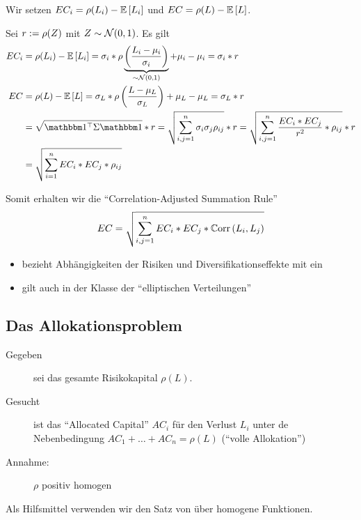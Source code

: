 Wir setzen $EC_i = \rho(L_i) - \mathbb{E} \left[ L_i \right]$ und $EC = \rho(L) - \mathbb{E} \left[ L \right]$.

Sei $r \mathrel{:=} \rho(Z)$ mit $Z \sim \mathcal{N}(0,1)$. Es gilt
\begin{equation*}
	\begin{aligned}
		EC_i &= \rho(L_i) - \EW[L_i] = \sigma_i * \rho\underbrace{\brackets{\frac{L_i - \mu_i}{\sigma_i}}}_{\sim \Normal(0,1)} + \mu_i - \mu_i = \sigma_i * r \\
		EC &= \rho(L) - \EW[L] = \sigma_L * \rho \brackets{\frac{L - \mu_L}{\sigma_L}} + \mu_L - \mu_L = \sigma_L * r \\
		&= \sqrt{\trans{\one} \Sigma \one} * r = \sqrt{\sum_{i,j = 1}^{n} \sigma_i \sigma_j \rho_{ij}} * r = \sqrt{\sum_{i,j = 1}^n \frac{EC_i * EC_j}{r^2} * \rho_{ij}} * r \\
		&= \sqrt{\sum_{i=1}^n EC_i * EC_j * \rho_{ij}}
	\end{aligned}
\end{equation*}

Somit erhalten wir die \enquote{Correlation-Adjusted Summation Rule}
\begin{equation*}
	EC = \sqrt{\sum_{i,j = 1}^n EC_i * EC_j * \mathbb{C}\mathrm{orr} \left( L_i , L_j \right)}
\end{equation*}

\begin{itemize}[nolistsep]
	\item bezieht Abhängigkeiten der Risiken und Diversifikationseffekte mit ein
	\item gilt auch in der Klasse der \enquote{elliptischen Verteilungen}
\end{itemize}



\subsection{Das Allokationsproblem}
\begin{description}
	\item[Gegeben] sei das gesamte Risikokapital $\rho(L)$.
	\item[Gesucht] ist das \enquote{Allocated Capital} $AC_i$ für den Verlust $L_i$ unter de Nebenbedingung $AC_1 + \dots + AC_n = \rho(L)$ (\enquote{volle Allokation})
	\item[Annahme:] $\rho$ positiv homogen
\end{description}

Als Hilfsmittel verwenden wir den Satz von  über homogene Funktionen.

